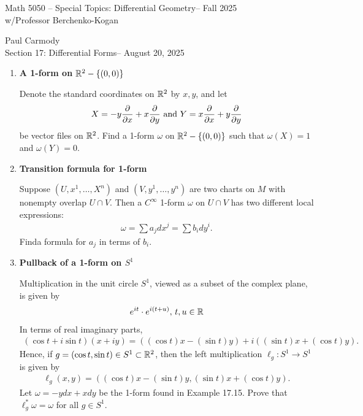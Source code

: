 \documentclass[12pt,a4paper]{report}
\newcommand{\CLASSNAME}{Math 5050 -- Special Topics: Differential Geometry}
\newcommand{\STUDENTNAME}{Paul Carmody}
\newcommand{\ASSIGNMENT}{Section 17: Differential Forms}
\newcommand{\DUEDATE}{August 20, 2025}
\newcommand{\PROFESSOR}{Professor Berchenko-Kogan}
\newcommand{\SEMESTER}{Fall 2025}
\begin{document}
\begin{center}
	\Large{\CLASSNAME -- \SEMESTER} \\
	\large{ w/\PROFESSOR}
\end{center}
\begin{center}
	\STUDENTNAME \\
	\ASSIGNMENT -- \DUEDATE\\
\end{center} 

\begin{enumerate}[label=\textbf{17.\arabic*.}]

\item \textbf{A 1-form on $\mathbb{R}^2-\{(0,0)\}$}

Denote the standard coordinates on $\mathbb{R}^2$ by $x,y$, and let
\begin{align*}
	X = -y\frac{\partial }{\partial x}+x\frac{\partial }{\partial y} \text{ and } Y=x\frac{\partial }{\partial x}+y\frac{\partial }{\partial y}
\end{align*}be vector files on $\mathbb{R}^2$.  Find a 1-form $\omega$ on $\mathbb{R}^2-\{(0,0)\}$ such that $\omega(X)=1$ and $\omega(Y)=0$.

\item \textbf{Transition formula for 1-form}

Suppose $(U, x^1,\dots, X^n)$ and $(V, y^1, \dots, y^n)$ are two charts on $M$ with nonempty overlap $U\cap V$.  Then a $C^\infty$ 1-form $\omega$ on $U\cap V$ has two different local expressions:
\begin{align*}
	\omega = \sum a_jdx^j=\sum b_idy^i.
\end{align*}Finda formula for $a_j$ in terms of $b_i$.

\item \textbf{Pullback of a 1-form on $S^1$}

Multiplication in the unit circle $S^1$, viewed as a subset of the complex plane, is given by 
\begin{align*}
	e^{it}\cdot e^{i(t+u)}, \, t,u \in \mathbb{R}
\end{align*}In terms of real imaginary parts, 
\begin{align*}
	(\cos t+i\sin t)(x+iy)= ((\cos t)x-(\sin t)y)+i((\sin t)x+(\cos t)y).
\end{align*}Hence, if $g=(\cos t, \sin t) \in S^1 \subset \mathbb{R}^2$, then the left multiplication $\ell_g:S^1\to S^1$ is given by 
\begin{align*}
	\ell_g(x,y) = ((\cos t)x-(\sin t)y, (\sin t)x + (\cos t)y).
\end{align*}Let $\omega = -ydx+xdy$ be the 1-form found in Example 17.15.  Prove that $\ell_g^*\omega = \omega$ for all $g \in S^1$.


\end{enumerate}
\end{document}
